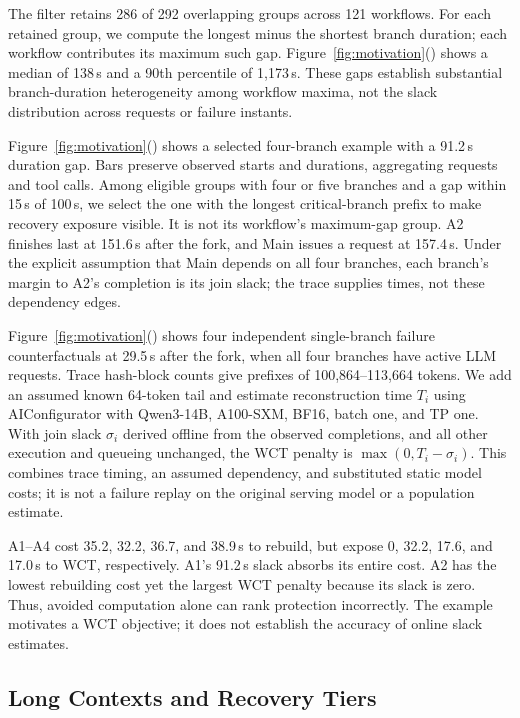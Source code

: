 The filter retains 286 of 292 overlapping groups across 121 workflows.
For each retained group, we compute the longest minus the shortest branch
duration; each workflow contributes its maximum such gap.
Figure~\ref{fig:motivation}() shows a median of
138\,s and a 90th percentile of 1,173\,s. These gaps establish substantial
branch-duration heterogeneity among workflow maxima, not the slack
distribution across requests or failure instants.

Figure~\ref{fig:motivation}() shows a
selected four-branch example with a 91.2\,s duration gap. Bars preserve
observed starts and durations, aggregating requests and tool calls.
Among eligible groups with four or five branches and a gap within
15\,s of 100\,s, we select the one with the longest critical-branch prefix
to make recovery exposure visible. It is not its workflow's maximum-gap
group. A2 finishes last at 151.6\,s after the fork, and Main issues a
request at 157.4\,s. Under the explicit assumption that Main depends on
all four branches, each branch's margin to A2's completion is its join
slack; the trace supplies times, not these dependency edges.

Figure~\ref{fig:motivation}() shows
four independent single-branch failure counterfactuals at 29.5\,s after
the fork, when all four branches have active LLM requests. Trace
hash-block counts give prefixes of 100,864--113,664 tokens. We add an
assumed known 64-token tail and estimate reconstruction time $T_i$ using
AIConfigurator with Qwen3-14B, A100-SXM, BF16, batch one, and TP one.
With join slack $\sigma_i$ derived offline from the observed completions,
and all other execution and queueing unchanged, the WCT penalty is
$\max(0,T_i-\sigma_i)$. This combines trace timing, an assumed dependency,
and substituted static model costs; it is not a failure replay on the
original serving model or a population estimate.

A1--A4 cost 35.2, 32.2, 36.7, and 38.9\,s to rebuild, but expose
0, 32.2, 17.6, and 17.0\,s to WCT, respectively. A1's 91.2\,s slack
absorbs its entire cost. A2 has the lowest rebuilding cost yet the
largest WCT penalty because its slack is zero. Thus, avoided computation
alone can rank protection incorrectly. The example motivates a WCT
objective; it does not establish the accuracy of online slack estimates.

\subsection{Long Contexts and Recovery Tiers}
\label{sec:motivation-long-context}

